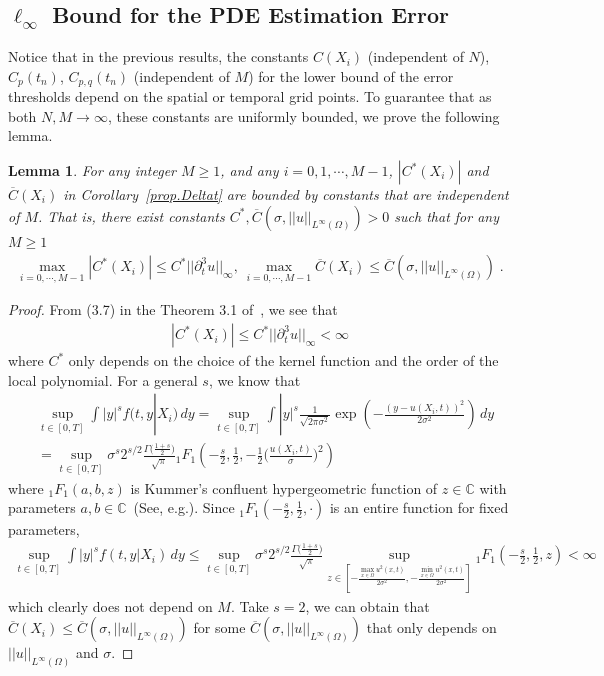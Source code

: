 \documentclass[a4paper,11pt]{article}
\newtheorem{lemma}{Lemma}[section]
\begin{document}
\subsection{$\ell_\infty$ Bound for the PDE Estimation Error}
Notice that in the previous results, the constants $C(X_i)$ (independent of $N$), $C_p(t_n)$, $C_{p,q}(t_n)$ (independent of $M$) for the lower bound of the error thresholds depend on the spatial or temporal grid points. To guarantee that as both $N,M\to\infty$, these constants are uniformly bounded, we prove the following lemma.
\begin{lemma}\label{lemma}
For any integer $M\geq 1$, and any $i=0,1,\cdots, M-1$,  $|C^*(X_i)|$ and $\overline{C}(X_i)$ in Corollary~\ref{prop.Deltat} are bounded by constants that are independent of $M$. That is, there exist constants $C^*, \overline{C}(\sigma,||u||_{L^\infty(\Omega)})>0$ such that for any $M\geq 1$
\begin{align}
\max_{i=0,\cdots, M-1}|C^*(X_i)|\leq C^*||\partial_t^3u||_\infty,~\max_{i=0,\cdots, M-1}\overline{C}(X_i)\leq \overline{C}(\sigma,||u||_{L^\infty(\Omega)})\;.
\end{align}
\end{lemma}
\begin{proof}
From (3.7) in the Theorem 3.1 of~\cite{fan1997local}, we see that
\begin{align*}
|C^*(X_i)|\leq C^*||\partial_t^3u||_\infty<\infty
\end{align*}
where $C^*$ only depends on the choice of the kernel function and the order of the local polynomial. For a general $s$, we know that
\begin{align*}
&\sup_{t\in [0,T]}\int |y|^sf(t,y|X_i)\,dy=\sup_{t\in [0,T]}\int |y|^s\frac{1}{\sqrt{2\pi\sigma^2}}\exp(-\frac{(y-u(X_i,t))^2}{2\sigma^2})\,dy\\
&=\sup_{t\in[0,T]}\sigma^s2^{s/2}\frac{\Gamma\big(\frac{1+s}{2}\big)}{\sqrt{\pi}}{_1F_1}(-\frac{s}{2},\frac{1}{2},-\frac{1}{2}\Big(\frac{u(X_i,t)}{\sigma}\Big)^2)
\end{align*}
where ${_1F_1}(a,b,z)$ is Kummer's confluent hypergeometric function of $z\in\mathbb{C}$ with parameters $a,b\in\mathbb{C}$~(See, e.g.\cite{winkelbauer2012moments}). Since ${_1F_1}(-\frac{s}{2},\frac{1}{2},\cdot)$ is an entire function for fixed parameters,
\begin{align*}
\sup_{t\in [0,T]}\int |y|^sf(t,y|X_i)\,dy\leq 	\sup_{t\in[0,T]}\sigma^s2^{s/2}\frac{\Gamma\big(\frac{1+s}{2}\big)}{\sqrt{\pi}}\sup_{z\in [-\frac{\max_{x\in\Omega} u^2(x,t)}{2\sigma^2},-\frac{\min_{x\in\Omega} u^2(x,t)}{2\sigma^2}]}{_1F_1}(-\frac{s}{2},\frac{1}{2},z)<\infty
\end{align*}
which clearly does not depend on $M$. Take $s=2$, we can obtain that $\overline{C}(X_i)\leq \overline{C}(\sigma,||u||_{L^\infty(\Omega)})$ for some $\overline{C}(\sigma,||u||_{L^\infty(\Omega)})$ that only depends on $||u||_{L^\infty(\Omega)}$ and $\sigma$.
\end{proof}
\end{document}

